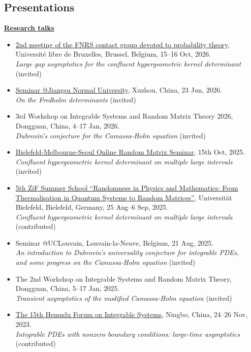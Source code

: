 \documentclass[12pt,a4paper]{article}
\begin{document}
\begin{cv}{}
\section{Presentations}
\textbf{\underline{Research talks}}
\begin{itemize}
    \item  \href{https://sites.google.com/view/fnrs-cg-probability/2d-meeting-2026}{2nd meeting of the FNRS contact group devoted to probability theory}, Université libre de Bruxelles, Brussel, Belgium, 15--16 Oct, 2026.\\ {\slshape Large gap asymptotics for the confluent hypergeometric kernel determinant} (invited)
    \item  \href{http://maths.jsnu.edu.cn/5b/96/c19269a416662/page.htm}{Seminar @Jiangsu Normal University}, Xuzhou, China, 23 Jun, 2026. \\ {\slshape On the Fredholm determinants} (invited)
    \item  3rd Workshop on Integrable Systems and Random Matrix Theory 2026, Dongguan, China, 4--17 Jan, 2026. \\ {\slshape Dubrovin's conjecture for the Camassa-Holm equation} (invited)
    \item  \href{https://www.bms-seminar.org/home}{Bielefeld-Melbourne-Seoul Online Random Matrix Seminar}, 15th Oct, 2025. \\ {\slshape Confluent hypergeometric kernel determinant on multiple large intervals} (invited)
    \item  \href{https://indico.physik.uni-bielefeld.de/event/220/}{5th ZiF Summer School ``Randomness in Physics and Mathematics: From Thermalisation in Quantum Systems to Random Matrices''}, Universit\"{a}t Bielefeld, Bielefeld, Germany, 25 Aug--6 Sep, 2025.\\ {\slshape Confluent hypergeometric kernel determinant on multiple large intervals} (contributed)
    \item  Seminar @UCLouvain, Louvain-la-Neuve, Belgium, 21 Aug, 2025. \\ {\slshape An introduction to Dubrovin's universality conjecture for integrable PDEs, and some progress on the Camassa-Holm equation} (invited)
    \item  The 2nd Workshop on Integrable Systems and Random Matrix Theory, Dongguan, China, 5--17 Jan, 2025.\\ {\slshape Transient asymptotics of the modified Camassa-Holm equation} (invited)
    \item \href{https://math.nbu.edu.cn/info/1084/6870.htm}{The 15th Hemudu Forum on Integrable Systems}, Ningbo, China, 24--26 Nov, 2023.\\ {\slshape Integrable PDEs with nonzero boundary conditions: large-time asymptotics} (contributed)
\end{itemize}
\vspace{1em}


\end{cv}
\end{document}
